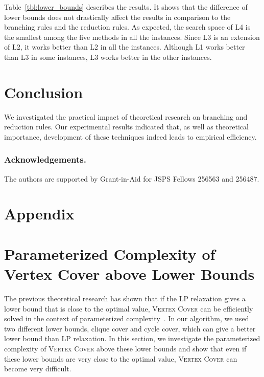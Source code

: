\documentclass[11pt]{article}
\begin{document}
Table~\ref{tbl:lower_bounds} describes the results.
It shows that the difference of lower bounds does not drastically affect the
results in comparison to the branching rules and the reduction rules.
As expected, the search space of L4 is the smallest among the five methods in all the instances.
Since L3 is an extension of L2, it works better than L2 in all the instances.
Although L1 works better than L3 in some instances, L3 works better in the other instances.




 \section{Conclusion}\label{sec:conclusion}
We investigated the practical impact of theoretical research on branching and reduction rules.
Our experimental results indicated that,
as well as theoretical importance,
development of these techniques indeed leads to empirical efficiency.
 
\subsubsection*{Acknowledgements.}
The authors are supported by Grant-in-Aid for JSPS Fellows 256563 and 256487.




\newpage
\section*{Appendix}
\appendix
\section{Parameterized Complexity of Vertex Cover above Lower Bounds}\label{sec:aboveLB}
The previous theoretical research has shown that if the LP relaxation gives a lower bound that is close to the optimal
value, \textsc{Vertex Cover} can be efficiently solved in the context of
parameterized complexity~\cite{DBLP:journals/corr/abs-1203-0833}.
In our algorithm, we used two different lower bounds, clique cover and cycle cover, which can give a better lower
bound than LP relaxation.
In this section, we investigate the parameterized complexity of \textsc{Vertex Cover} above these lower bounds and show
that even if these lower bounds are very close to the optimal value, \textsc{Vertex Cover} can become very difficult.
\end{document}
